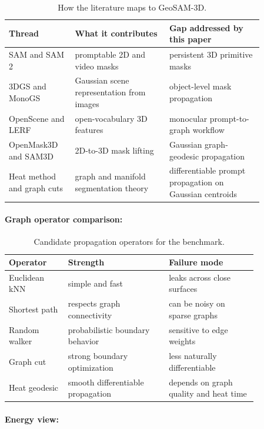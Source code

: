 \documentclass{article}
\begin{document}
\begin{table}[t]
\centering
\caption{How the literature maps to GeoSAM-3D.}
\begin{tabular}{@{}p{0.22\linewidth}p{0.32\linewidth}p{0.32\linewidth}@{}}
\toprule
\textbf{Thread} & \textbf{What it contributes} & \textbf{Gap addressed by this paper}\\
\midrule
SAM and SAM 2 & promptable 2D and video masks & persistent 3D primitive masks\\
3DGS and MonoGS & Gaussian scene representation from images & object-level mask propagation\\
OpenScene and LERF & open-vocabulary 3D features & monocular prompt-to-graph workflow\\
OpenMask3D and SAM3D & 2D-to-3D mask lifting & Gaussian graph-geodesic propagation\\
Heat method and graph cuts & graph and manifold segmentation theory & differentiable prompt propagation on Gaussian centroids\\
\bottomrule
\end{tabular}
\end{table}

\paragraph{Graph operator comparison:}

\begin{table}[t]
\centering
\caption{Candidate propagation operators for the benchmark.}
\begin{tabular}{@{}p{0.20\linewidth}p{0.34\linewidth}p{0.30\linewidth}@{}}
\toprule
\textbf{Operator} & \textbf{Strength} & \textbf{Failure mode}\\
\midrule
Euclidean kNN & simple and fast & leaks across close surfaces\\
Shortest path & respects graph connectivity & can be noisy on sparse graphs\\
Random walker & probabilistic boundary behavior & sensitive to edge weights\\
Graph cut & strong boundary optimization & less naturally differentiable\\
Heat geodesic & smooth differentiable propagation & depends on graph quality and heat time\\
\bottomrule
\end{tabular}
\end{table}

\paragraph{Energy view:}
\end{document}
